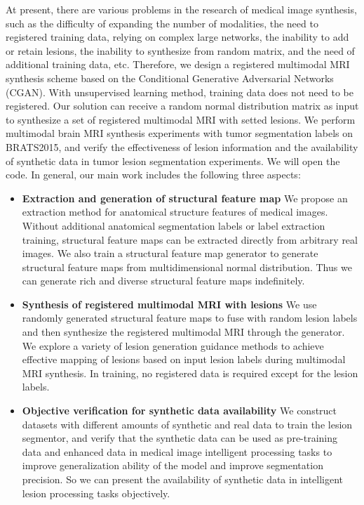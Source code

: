 \documentclass[letterpaper]{article} %
\begin{document}
At present, there are various problems in the research of medical image synthesis, such as the difficulty of expanding the number of modalities, the need to registered training data, relying on complex large networks, the inability to add or retain lesions, the inability to synthesize from random matrix, and the need of additional training data, etc. Therefore, we design a registered multimodal MRI synthesis scheme based on the Conditional Generative Adversarial Networks (CGAN)\cite{70mirza2014conditional}. With unsupervised learning method, training data does not need to be registered. Our solution can receive a random normal distribution matrix as input to synthesize a set of registered multimodal MRI with setted lesions. We perform multimodal brain MRI synthesis experiments with tumor segmentation labels on BRATS2015, and verify the effectiveness of lesion information and the availability of synthetic data in tumor lesion segmentation experiments. We will open the code. In general, our main work includes the following three aspects:

\begin{itemize}
	\item \textbf{Extraction and generation of structural feature map}
	We propose an extraction method for anatomical structure features of medical images. Without additional anatomical segmentation labels or label extraction training, structural feature maps can be extracted directly from arbitrary real images. We also train a structural feature map generator to generate structural feature maps from multidimensional normal distribution. Thus we can generate rich and diverse structural feature maps indefinitely.
	\item \textbf{Synthesis of registered multimodal MRI with lesions}	
	We use randomly generated structural feature maps to fuse with random lesion labels and then synthesize the registered multimodal MRI through the generator. We explore a variety of lesion generation guidance methods to achieve effective mapping of lesions based on input lesion labels during multimodal MRI synthesis. In training, no registered data is required except for the lesion labels. 
	\item \textbf{Objective verification for synthetic data availability}
	We construct datasets with different amounts of synthetic and real data to train the lesion segmentor, and verify that the synthetic data can be used as pre-training data and enhanced data in medical image intelligent processing tasks to improve generalization ability of the model and improve segmentation precision. So we can present the availability of synthetic data in intelligent lesion processing tasks objectively.
\end{itemize}
\end{document}
